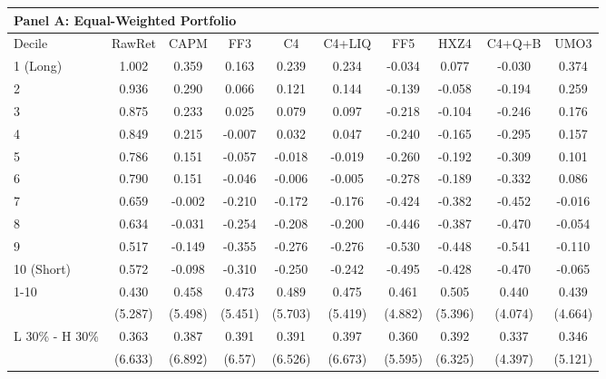 \begin{tabular}{lccccccccc}
\hline
\hline
\multicolumn{10}{l}{Panel A: Equal-Weighted Portfolio} \bigstrut\\
\hline
Decile  & RawRet  & CAPM    & FF3     & C4      & C4+LIQ  & FF5     & HXZ4    & C4+Q+B  & UMO3 \bigstrut\\
\hline
1 (Long) & 1.002   & 0.359   & 0.163   & 0.239   & 0.234   & -0.034  & 0.077   & -0.030  & 0.374 \bigstrut[t]\\
2       & 0.936   & 0.290   & 0.066   & 0.121   & 0.144   & -0.139  & -0.058  & -0.194  & 0.259 \\
3       & 0.875   & 0.233   & 0.025   & 0.079   & 0.097   & -0.218  & -0.104  & -0.246  & 0.176 \\
4       & 0.849   & 0.215   & -0.007  & 0.032   & 0.047   & -0.240  & -0.165  & -0.295  & 0.157 \\
5       & 0.786   & 0.151   & -0.057  & -0.018  & -0.019  & -0.260  & -0.192  & -0.309  & 0.101 \\
6       & 0.790   & 0.151   & -0.046  & -0.006  & -0.005  & -0.278  & -0.189  & -0.332  & 0.086 \\
7       & 0.659   & -0.002  & -0.210  & -0.172  & -0.176  & -0.424  & -0.382  & -0.452  & -0.016 \\
8       & 0.634   & -0.031  & -0.254  & -0.208  & -0.200  & -0.446  & -0.387  & -0.470  & -0.054 \\
9       & 0.517   & -0.149  & -0.355  & -0.276  & -0.276  & -0.530  & -0.448  & -0.541  & -0.110 \\
10 (Short) & 0.572   & -0.098  & -0.310  & -0.250  & -0.242  & -0.495  & -0.428  & -0.470  & -0.065 \bigstrut[b]\\
\hline
\multirow{2}[1]{*}{1-10} & 0.430   & 0.458   & 0.473   & 0.489   & 0.475   & 0.461   & 0.505   & 0.440   & 0.439 \bigstrut[t]\\
        & (5.287) & (5.498) & (5.451) & (5.703) & (5.419) & (4.882) & (5.396) & (4.074) & (4.664) \\
\multicolumn{1}{l}{\multirow{2}[1]{*}{L 30\% - H 30\%}} & 0.363   & 0.387   & 0.391   & 0.391   & 0.397   & 0.360   & 0.392   & 0.337   & 0.346 \\
        & (6.633) & (6.892) & (6.57)  & (6.526) & (6.673) & (5.595) & (6.325) & (4.397) & (5.121) \bigstrut[b]\\
\hline
\end{tabular}%
